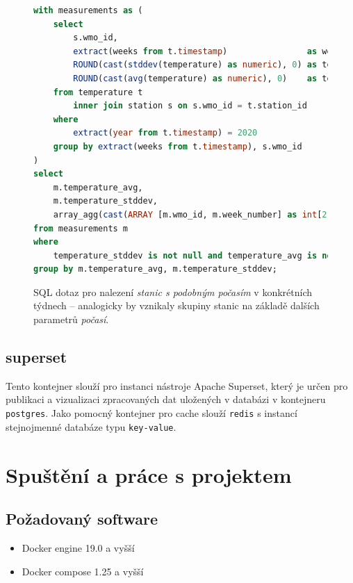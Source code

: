 \documentclass[10pt,a4paper,titlepage]{extarticle}
\begin{document}
\begin{figure}[H]
    \begin{lstlisting}[language=SQL]
with measurements as (
    select
        s.wmo_id,
        extract(weeks from t.timestamp)                as week_number,
        ROUND(cast(stddev(temperature) as numeric), 0) as temperature_stddev,
        ROUND(cast(avg(temperature) as numeric), 0)    as temperature_avg
    from temperature t
        inner join station s on s.wmo_id = t.station_id
    where
        extract(year from t.timestamp) = 2020
    group by extract(weeks from t.timestamp), s.wmo_id
)
select
    m.temperature_avg,
    m.temperature_stddev,
    array_agg(cast(ARRAY [m.wmo_id, m.week_number] as int[2])) as stations_in_time
from measurements m
where
    temperature_stddev is not null and temperature_avg is not null
group by m.temperature_avg, m.temperature_stddev;
    \end{lstlisting}
    \caption{SQL dotaz pro nalezení \emph{stanic s podobným počasím} v konkrétních týdnech -- analogicky by vznikaly
    skupiny stanic na základě dalších parametrů \emph{počasí}.}
    \label{lst:sql-dotaz-b}
\end{figure}

    \subsection{superset}

    Tento kontejner slouží pro instanci nástroje Apache Superset, který je určen pro publikaci a vizualizaci
    zpracovaných dat uložených v databázi v kontejneru \texttt{postgres}. Jako pomocný kontejner pro cache slouží
    \texttt{redis} s instancí stejnojmenné databáze typu \texttt{key-value}.

    \section{Spuštění a práce s projektem}

    \subsection{Požadovaný software}\label{requirements}

    \begin{itemize}
        \itemsep1pt\parskip0pt
        \item Docker engine 19.0 a vyšší
        \item Docker compose 1.25 a vyšší
    \end{itemize}
\end{document}
